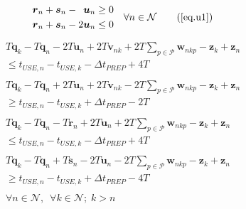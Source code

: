 \begin{equation}
    \begin{split}
        \begin{alignedat}{8}
            &&\boldsymbol{r}_{n} && {}+{} &&\boldsymbol{s}_{n} && {}-{} 
            &&\boldsymbol{u}_{n} &\ge 0\\
            &&\boldsymbol{r}_{n} && {}+{} &&\boldsymbol{s}_{n} && {}-{} 
            &2&\boldsymbol{u}_{n} &\le 0\\
        \end{alignedat}
        \quad \forall n \in \mathcal{N}
    \end{split}
    \tag{\ref{eq.u1}}
\end{equation}
\begin{equation}
    \begin{split}
        \begin{aligned}
            T \boldsymbol{q}_{k} - T \boldsymbol{q}_{n} - 2T \boldsymbol{u}_{n} 
            + 2T \boldsymbol{v}_{nk} + 2T \sum_{p \in \mathcal{P}}
            \boldsymbol{w}_{nkp} - \boldsymbol{z}_{k} + \boldsymbol{z}_{n}\\
            \le t_{\mathit{USE},n} - t_{\mathit{USE},k}
            - \Delta t_{\mathit{PREP}} + 4T
        \end{aligned}\\
        \begin{aligned}
            T \boldsymbol{q}_{k} - T \boldsymbol{q}_{n} + 2T \boldsymbol{u}_{n} 
            + 2T \boldsymbol{v}_{nk} - 2T \sum_{p \in \mathcal{P}}
            \boldsymbol{w}_{nkp} - \boldsymbol{z}_{k} + \boldsymbol{z}_{n}\\
            \ge t_{\mathit{USE},n} - t_{\mathit{USE},k}
            + \Delta t_{\mathit{PREP}} - 2T
        \end{aligned}\\
        \begin{aligned}
            T \boldsymbol{q}_{k} - T \boldsymbol{q}_{n} - T \boldsymbol{r}_{n}
            + 2T \boldsymbol{u}_{n} + 2T \sum_{p \in \mathcal{P}}
            \boldsymbol{w}_{nkp} - \boldsymbol{z}_{k} + \boldsymbol{z}_{n}\\
            \le t_{\mathit{USE},n} - t_{\mathit{USE},k}
            - \Delta t_{\mathit{PREP}} + 4T
        \end{aligned}\\
        \begin{aligned}
            T \boldsymbol{q}_{k} - T \boldsymbol{q}_{n} + T \boldsymbol{s}_{n}
            - 2T \boldsymbol{u}_{n} - 2T \sum_{p \in \mathcal{P}}
            \boldsymbol{w}_{nkp} - \boldsymbol{z}_{k} + \boldsymbol{z}_{n}\\
            \ge t_{\mathit{USE},n} - t_{\mathit{USE},k}
            + \Delta t_{\mathit{PREP}} - 4T
        \end{aligned}\\
        \begin{aligned}
            \forall n \in \mathcal{N}, \enspace \forall k \in \mathcal{N}; \;
            k > n
        \end{aligned}\\
    \end{split}
    \label{eq.k6}
\end{equation}
